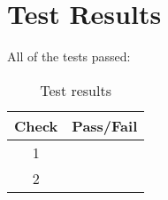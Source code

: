 \section{Test Results}
All of the tests passed:
\begin{table}[H]
	\caption{Test results}
	\label{tab:results}
	\centering \fontsize{10}{10}\selectfont
	\begin{tabular}{c | c  } %
		\hline\hline
		\textbf{Check} 						  		&\textbf{Pass/Fail} \\ 
		\hline
	   1	   			&  \\ 
	   2	   			&  \\ 
	   \hline\hline
	\end{tabular}
\end{table}





